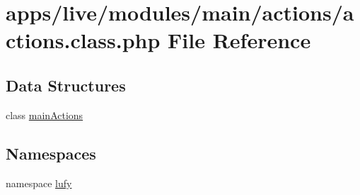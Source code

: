 \hypertarget{live_2modules_2main_2actions_2actions_8class_8php}{\section{apps/live/modules/main/actions/actions.class.\-php File Reference}
\label{live_2modules_2main_2actions_2actions_8class_8php}
}
\subsection*{Data Structures}
\begin{DoxyCompactItemize}
\item 
class \hyperlink{classmain_actions}{main\-Actions}
\end{DoxyCompactItemize}
\subsection*{Namespaces}
\begin{DoxyCompactItemize}
\item 
namespace \hyperlink{namespacelufy}{lufy}
\end{DoxyCompactItemize}
